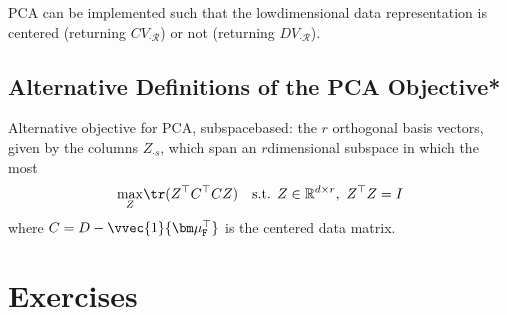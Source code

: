 \documentclass[letterpaper,10pt,english]{jupyterBook}
\begin{document}
\sphinxAtStartPar
PCA can be implemented such that the low\sphinxhyphen{}dimensional data representation is centered (returning \(CV_{\cdot \mathcal{R}}\)) or not (returning \(DV_{\cdot \mathcal{R}}\)).


\subsection{Alternative Definitions of the PCA Objective*}
\label{\detokenize{dim_reduction_pca:alternative-definitions-of-the-pca-objective}}
\sphinxAtStartPar
Alternative objective for PCA, subspace\sphinxhyphen{}based:
the \(r\) orthogonal basis vectors, given by the columns \(Z_{\cdot s}\), which span an \(r\)\sphinxhyphen{}dimensional subspace in which the most
\label{equation:dim_reduction_pca:a8f1ab0d-1eac-40b6-95dc-4b1fa9cd0c21}\begin{align}
    \max_{Z}& \tr(Z^\top C^\top C Z) & \text{s.t. } Z\in\mathbb{R}^{d\times r},\ Z^\top Z =I
\end{align}
\sphinxAtStartPar
where \(C=D-\vvec{1}{\bm\mu_\mathtt{F}^\top}\) is the centered data matrix.

\sphinxstepscope


\section{Exercises}
\label{\detokenize{dim_reduction_exercises:exercises}}\label{\detokenize{dim_reduction_exercises::doc}}
\end{document}

